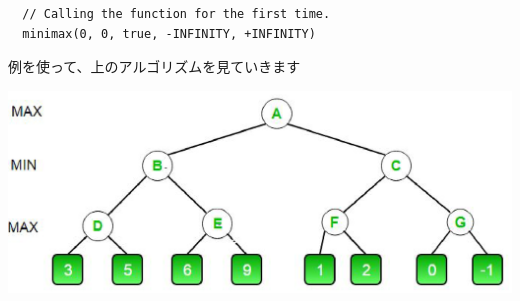 \documentclass[uplatex,a4paper,11pt,oneside,openany]{jsbook}
\begin{document}
\begin{verbatim}
  // Calling the function for the first time.
  minimax(0, 0, true, -INFINITY, +INFINITY)
\end{verbatim}

例を使って、上のアルゴリズムを見ていきます

\begin{center}
  \includegraphics[width=0.8\hsize]{figures/eps/MIN_MAX1.eps}
\end{center}
\end{document}
